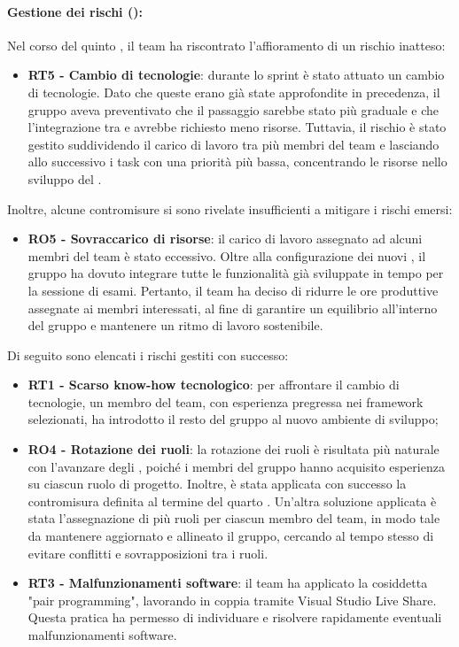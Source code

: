 \paragraph*{Gestione dei rischi ():}
\par Nel corso del quinto , il team ha riscontrato l'affioramento di un rischio inatteso:
\begin{itemize}
  \item \textbf{RT5 - Cambio di tecnologie}: durante lo sprint è stato attuato un cambio di tecnologie. Dato che queste erano già state approfondite in precedenza, il gruppo aveva preventivato che il passaggio sarebbe stato più graduale e che l'integrazione tra  e  avrebbe richiesto meno risorse. Tuttavia, il rischio è stato gestito suddividendo il carico di lavoro tra più membri del team e lasciando allo  successivo i task con una priorità più bassa, concentrando le risorse nello sviluppo del .
\end{itemize}

\par Inoltre, alcune contromisure si sono rivelate insufficienti a mitigare i rischi emersi:
\begin{itemize}
  \item \textbf{RO5 - Sovraccarico di risorse}: il carico di lavoro assegnato ad alcuni membri del team è stato eccessivo. Oltre alla configurazione dei nuovi , il gruppo ha dovuto integrare tutte le funzionalità già sviluppate in tempo per la sessione di esami. Pertanto, il team ha deciso di ridurre le ore produttive assegnate ai membri interessati, al fine di garantire un equilibrio all’interno del gruppo e mantenere un ritmo di lavoro sostenibile.
\end{itemize}

\vspace{0.5\baselineskip}
\par Di seguito sono elencati i rischi gestiti con successo:
\begin{itemize}
  \item \textbf{RT1 - Scarso know-how tecnologico}: per affrontare il cambio di tecnologie, un membro del team, con esperienza pregressa nei framework selezionati, ha introdotto il resto del gruppo al nuovo ambiente di sviluppo;
  \item \textbf{RO4 - Rotazione dei ruoli}: la rotazione dei ruoli è risultata più naturale con l'avanzare degli , poiché i membri del gruppo hanno acquisito esperienza su ciascun ruolo di progetto. Inoltre, è stata applicata con successo la contromisura definita al termine del quarto . Un'altra soluzione applicata è stata l'assegnazione di più ruoli per ciascun membro del team, in modo tale da mantenere aggiornato e allineato il gruppo, cercando al tempo stesso di evitare conflitti e sovrapposizioni tra i ruoli.
  \item \textbf{RT3 - Malfunzionamenti software}: il team ha applicato la cosiddetta "pair programming", lavorando in coppia tramite Visual Studio Live Share. Questa pratica ha permesso di individuare e risolvere rapidamente eventuali malfunzionamenti software.
\end{itemize}
